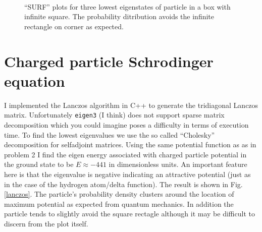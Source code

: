\documentclass[singlepage,notitlepage,nofootinbib,11pt]{revtex4-1}
\begin{document}
\begin{figure}[h]
  \\
  \caption{\label{particles} ``SURF'' plots for three lowest eigenstates of particle in a box with infinite square. The probability ditribution avoids the infinite rectangle on corner as expected.}
\end{figure}

\clearpage
\section{Charged particle Schrodinger equation}
I implemented the Lanczos algorithm in C++ to generate the tridiagonal Lanczos matrix.  Unfortunately \texttt{eigen3} (I think) does not support sparse matrix decomposition which you could imagine poses a difficulty in terms of execution time. To find the lowest eigenvalues we use the so called ``Cholesky'' decomposition for selfadjoint matrices. Using the same potential function as as in problem 2 I find the eigen energy associated with charged particle potential in the ground state to be $\boxed{E\approx-441}$ in dimensionless units. An important feature here is that the eigenvalue is negative indicating an attractive potential (just as in the case of the hydrogen atom/delta function). The result is shown in Fig. \ref{lanczos}. The particle's probability density clusters around the location of maximum potential as expected from quantum mechanics. In addition the particle tends to slightly avoid the square rectagle although it may be difficult to discern from the plot itself.
\end{document}
